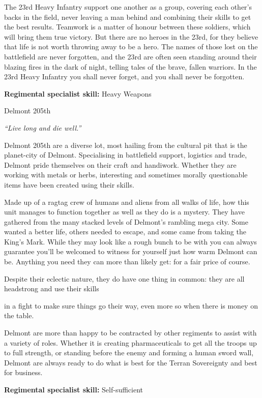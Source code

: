 \documentclass{scrbook}
\begin{document}
The 23rd Heavy Infantry support one another as a group, covering each other's backs in the field, never leaving a man behind and combining their skills to get the best results. Teamwork is a matter of honour between these soldiers, which will bring them true victory. But there are no heroes in the 23rd, for they believe that life is not worth throwing away to be a hero. The names of those lost on the battlefield are never forgotten, and the 23rd are often seen standing around their blazing fires in the dark of night, telling tales of the brave, fallen warriors. In the 23rd Heavy Infantry you shall never forget, and you shall never be forgotten.

\textbf{Regimental specialist skill:} Heavy Weapons

Delmont 205th

\textit{``Live long and die well.''}

Delmont 205th are a diverse lot, most hailing from the cultural pit that is the planet-city of Delmont. Specialising in battlefield support, logistics and trade, Delmont pride themselves on their craft and handiwork. Whether they are working with metals or herbs, interesting and sometimes morally questionable items have been created using their skills.

Made up of a ragtag crew of humans and aliens from all walks of life, how this unit manages to function together as well as they do is a mystery. They have gathered from the many stacked levels of Delmont's rambling mega city. Some wanted a better life, others needed to escape, and some came from taking the King's Mark. While they may look like a rough bunch to be with you can always guarantee you'll be welcomed to witness for yourself just how warm Delmont can be. Anything you need they can more than likely get: for a fair price of course.

Despite their eclectic nature, they do have one thing in common: they are all headstrong and use their skills

in a fight to make sure things go their way, even more so when there is money on the table.

Delmont are more than happy to be contracted by other regiments to assist with a variety of roles. Whether it is creating pharmaceuticals to get all the troops up to full strength, or standing before the enemy and forming a human sword wall, Delmont are always ready to do what is best for the Terran Sovereignty and best for business.

\textbf{Regimental specialist skill:} Self-sufficient
\end{document}
